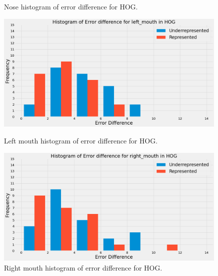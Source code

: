 \documentclass{l4proj}
\begin{document}
\begin{figure}[h!]
\begin{minipage}{0.51\textwidth}
    \caption{Nose histogram of error difference for HOG.}
    \label{dlib_nose}
  \end{minipage}
    \hfill
  \begin{minipage}{0.49\textwidth}
    \includegraphics[width=\textwidth]{images/dlib_leftmouth.png}
    \caption{Left mouth histogram of error difference for HOG.}
    \label{dlib_leftmouth}
  \end{minipage} 
      \hfill
    \begin{minipage}{0.49\textwidth}
    \includegraphics[width=\textwidth]{images/dlib_rightmouth.png}
    \caption{Right mouth histogram of error difference for HOG.}
    \label{dlib_rightmouth}
  \end{minipage} 
 
\end{figure}
\end{document}
